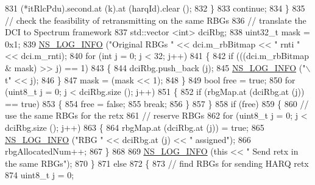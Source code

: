 \begin{DoxyCode}
831                   (*itRlcPdu).second.at (k).at (harqId).clear ();
832                 \}
833               \textcolor{keywordflow}{continue};
834             \}
835           \textcolor{comment}{// check the feasibility of retransmitting on the same RBGs}
836           \textcolor{comment}{// translate the DCI to Spectrum framework}
837           std::vector <int> dciRbg;
838           uint32\_t mask = 0x1;
839           \hyperlink{group__logging_gafbd73ee2cf9f26b319f49086d8e860fb}{NS\_LOG\_INFO} (\textcolor{stringliteral}{"Original RBGs "} << dci.m\_rbBitmap << \textcolor{stringliteral}{" rnti "} << dci.m\_rnti);
840           \textcolor{keywordflow}{for} (\textcolor{keywordtype}{int} j = 0; j < 32; j++)
841             \{
842               \textcolor{keywordflow}{if} (((dci.m\_rbBitmap & mask) >> j) == 1)
843                 \{
844                   dciRbg.push\_back (j);
845                   \hyperlink{group__logging_gafbd73ee2cf9f26b319f49086d8e860fb}{NS\_LOG\_INFO} (\textcolor{stringliteral}{"\(\backslash\)t"} << j);
846                 \}
847               mask = (mask << 1);
848             \}
849           \textcolor{keywordtype}{bool} free = \textcolor{keyword}{true};
850           \textcolor{keywordflow}{for} (uint8\_t j = 0; j < dciRbg.size (); j++)
851             \{
852               \textcolor{keywordflow}{if} (rbgMap.at (dciRbg.at (j)) == \textcolor{keyword}{true})
853                 \{
854                   free = \textcolor{keyword}{false};
855                   \textcolor{keywordflow}{break};
856                 \}
857             \}
858           \textcolor{keywordflow}{if} (free)
859             \{
860               \textcolor{comment}{// use the same RBGs for the retx}
861               \textcolor{comment}{// reserve RBGs}
862               \textcolor{keywordflow}{for} (uint8\_t j = 0; j < dciRbg.size (); j++)
863                 \{
864                   rbgMap.at (dciRbg.at (j)) = \textcolor{keyword}{true};
865                   \hyperlink{group__logging_gafbd73ee2cf9f26b319f49086d8e860fb}{NS\_LOG\_INFO} (\textcolor{stringliteral}{"RBG "} << dciRbg.at (j) << \textcolor{stringliteral}{" assigned"});
866                   rbgAllocatedNum++;
867                 \}
868 
869               \hyperlink{group__logging_gafbd73ee2cf9f26b319f49086d8e860fb}{NS\_LOG\_INFO} (\textcolor{keyword}{this} << \textcolor{stringliteral}{" Send retx in the same RBGs"});
870             \}
871           \textcolor{keywordflow}{else}
872             \{
873               \textcolor{comment}{// find RBGs for sending HARQ retx}
874               uint8\_t j = 0;

\end{DoxyCode}
